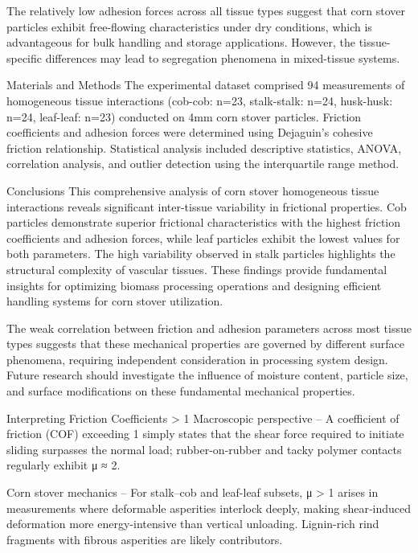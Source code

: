 \documentclass[xcolor=dvipsnames,10pt,hidelinks]{article}
\begin{document}
The relatively low adhesion forces across all tissue types suggest that corn stover particles exhibit free-flowing characteristics under dry conditions, which is advantageous for bulk handling and storage applications. However, the tissue-specific differences may lead to segregation phenomena in mixed-tissue systems.

Materials and Methods
The experimental dataset comprised 94 measurements of homogeneous tissue interactions (cob-cob: n=23, stalk-stalk: n=24, husk-husk: n=24, leaf-leaf: n=23) conducted on 4mm corn stover particles. Friction coefficients and adhesion forces were determined using Dejaguin's cohesive friction relationship. Statistical analysis included descriptive statistics, ANOVA, correlation analysis, and outlier detection using the interquartile range method.

Conclusions
This comprehensive analysis of corn stover homogeneous tissue interactions reveals significant inter-tissue variability in frictional properties. Cob particles demonstrate superior frictional characteristics with the highest friction coefficients and adhesion forces, while leaf particles exhibit the lowest values for both parameters. The high variability observed in stalk particles highlights the structural complexity of vascular tissues. These findings provide fundamental insights for optimizing biomass processing operations and designing efficient handling systems for corn stover utilization.

The weak correlation between friction and adhesion parameters across most tissue types suggests that these mechanical properties are governed by different surface phenomena, requiring independent consideration in processing system design. Future research should investigate the influence of moisture content, particle size, and surface modifications on these fundamental mechanical properties.

Interpreting Friction Coefficients > 1
Macroscopic perspective – A coefficient of friction (COF) exceeding 1 simply states that the shear force required to initiate sliding surpasses the normal load; rubber-on-rubber and tacky polymer contacts regularly exhibit μ ≈ 2.

Corn stover mechanics – For stalk–cob and leaf-leaf subsets, μ > 1 arises in measurements where deformable asperities interlock deeply, making shear‐induced deformation more energy-intensive than vertical unloading. Lignin-rich rind fragments with fibrous asperities are likely contributors.
\end{document}
